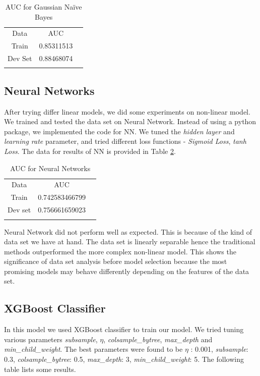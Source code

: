 \documentclass[conference]{IEEEtran}
\numberwithin{equation}{section}
\numberwithin{figure}{section}
\numberwithin{table}{section}
\begin{document}
\begin{table}[!htb]
 \centering
 \caption{AUC for Gaussian Na{\"i}ve Bayes}
 \label{nb_tab}
\begin{tabular}{ c c c } 
	    \noalign{\smallskip}\hline\noalign{\smallskip}
		Data & AUC \\
    	   \noalign{\smallskip}\hline\noalign{\smallskip}
		Train &  0.85311513\\
		Dev Set & 0.88468074\\
		\noalign{\smallskip}\hline\noalign{\smallskip}
  \end{tabular} 
\end{table}

\subsection{Neural Networks}
After trying differ linear models, we did some experiments on non-linear model. We trained and tested the data set on Neural Network. Instead of using a python package, we implemented the code for NN. We tuned the \textit{hidden layer} and \textit{learning rate} parameter,  and tried different loss functions - \textit{Sigmoid Loss}, \textit{tanh Loss}. The data for results of NN is provided in Table \ref{tab_nn}.

\begin{table}[!htb]
 \centering
 \caption{AUC for Neural Networks}
 \label{tab_nn}
\begin{tabular}{ c c c } 
	    \noalign{\smallskip}\hline\noalign{\smallskip}
		Data &  AUC \\
    	   \noalign{\smallskip}\hline\noalign{\smallskip}
		Train &  0.742583466799\\
		Dev set &  0.756661659023\\
				\noalign{\smallskip}\hline\noalign{\smallskip}
  \end{tabular} 
\end{table}

Neural Network did not perform well as expected. This is because of the kind of data set we have at hand. The data set is linearly separable hence the traditional methods outperformed the more complex non-linear model. This shows the significance of data set analysis before model selection because the most promising models may behave differently depending on the features of the data set.  

\subsection{XGBoost Classifier}
In this model we used XGBoost classifier to train our model. We tried tuning various parameters \textit{subsample}, \textit{$\eta$}, \textit{colsample\_bytree}, \textit{max\_depth} and \textit{min\_child\_weight}. The best parameters were found to be \textit{$\eta$} : 0.001, \textit{subsample}: 0.3, \textit{colsample\_bytree}: 0.5, \textit{max\_depth}: 3, \textit{min\_child\_weight}: 5. The following table lists some results. 
 
\end{document}
